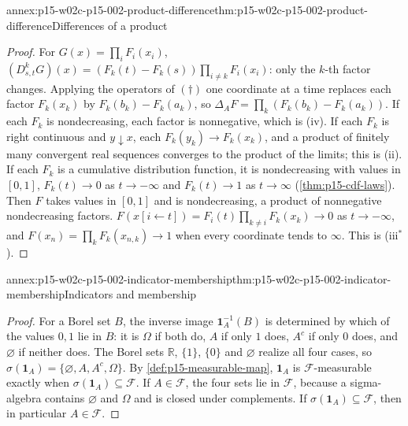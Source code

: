 \begin{annexitem}{annex:p15-w02c-p15-002-product-difference}{thm:p15-w02c-p15-002-product-difference}{Differences of a product}
\begin{proof}
For \(G(x)=\prod_iF_i(x_i)\),
\((D^k_{s,t}G)(x)=(F_k(t)-F_k(s))\prod_{i\neq k}F_i(x_i)\): only the
\(k\)-th factor changes. Applying the operators of \((\dagger)\) one
coordinate at a time replaces each factor \(F_k(x_k)\) by
\(F_k(b_k)-F_k(a_k)\), so
\(\Delta_AF=\prod_k(F_k(b_k)-F_k(a_k))\). If each \(F_k\) is nondecreasing,
each factor is nonnegative, which is (iv). If each \(F_k\) is right
continuous and \(y\downarrow x\), each \(F_k(y_k)\to F_k(x_k)\), and a
product of finitely many convergent real sequences converges to the
product of the limits; this is (ii). If each \(F_k\) is a cumulative
distribution function, it is nondecreasing with values in \([0,1]\),
\(F_k(t)\to0\) as \(t\to-\infty\) and \(F_k(t)\to1\) as \(t\to\infty\)
(\cref{thm:p15-cdf-laws}). Then \(F\) takes values in \([0,1]\) and is
nondecreasing, a product of nonnegative nondecreasing factors.
\(F(x[i\gets t])=F_i(t)\prod_{k\neq i}F_k(x_k)\to0\) as \(t\to-\infty\),
and \(F(x_n)=\prod_kF_k(x_{n,k})\to1\) when every coordinate tends to
\(\infty\). This is (iii\(^*\)).
\end{proof}
\end{annexitem}

\begin{annexitem}{annex:p15-w02c-p15-002-indicator-membership}{thm:p15-w02c-p15-002-indicator-membership}{Indicators and membership}
\begin{proof}
For a Borel set \(B\), the inverse image \(\mathbf1_A^{-1}(B)\) is
determined by which of the values \(0,1\) lie in \(B\): it is \(\Omega\)
if both do, \(A\) if only \(1\) does, \(A^c\) if only \(0\) does, and
\(\varnothing\) if neither does. The Borel sets \(\mathbb R\), \(\{1\}\),
\(\{0\}\) and \(\varnothing\) realize all four cases, so
\(\sigma(\mathbf1_A)=\{\varnothing,A,A^c,\Omega\}\).
By \cref{def:p15-measurable-map}, \(\mathbf1_A\) is
\(\mathcal F\)-measurable exactly when
\(\sigma(\mathbf1_A)\subseteq\mathcal F\). If \(A\in\mathcal F\), the four
sets lie in \(\mathcal F\), because a sigma-algebra contains
\(\varnothing\) and \(\Omega\) and is closed under complements.
If \(\sigma(\mathbf1_A)\subseteq\mathcal F\), then in particular
\(A\in\mathcal F\).
\end{proof}
\end{annexitem}

